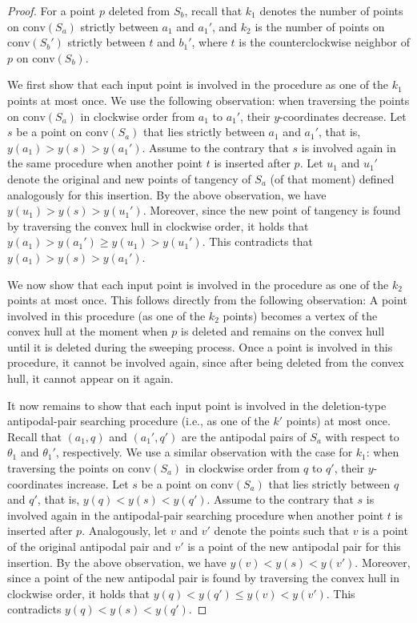 \documentclass[english,a4paper, cleveref, autoref, thm-restate, nolineno]{socg-lipics-v2021}
\theoremstyle{star}
\theoremstyle{claimstar}
\newcommand{\conv}{\ensuremath{\mathrm{conv}}}
\begin{document}
\begin{proof}
    For a point $p$ deleted from $S_b$, recall that $k_1$ denotes the number of points on $\conv(S_a)$ strictly between $a_1$ and $a_1'$, and $k_2$ is the number of points on $\conv(S_b')$ strictly between $t$ and $b_1'$, where $t$ is the counterclockwise neighbor of $p$ on $\conv(S_b)$.

    We first show that each input point is involved in the procedure as one of the $k_1$ points at most once. 
    We use the following observation:
    when traversing the points on $\conv(S_a)$ in clockwise order from $a_1$ to $a_1'$, their $y$-coordinates decrease.
    Let $s$ be a point on $\conv(S_a)$ that lies strictly between $a_1$ and $a_1'$, that is, $y(a_1) > y(s) > y(a_1')$.
    Assume to the contrary that $s$ is involved again in the same procedure when another point $t$ is inserted after $p$.
    Let $u_1$ and $u_1'$ denote the original and new points of tangency of $S_a$ (of that moment) defined analogously for this insertion.
    By the above observation, we have $y(u_1) > y(s) > y(u_1')$.
    Moreover, since the new point of tangency is found by traversing the convex hull in clockwise order, 
    it holds that $y(a_1) > y(a_1') \ge y(u_1) > y(u_1')$.
    This contradicts that $y(a_1) > y(s) > y(a_1')$.

    We now show that each input point is involved in the procedure as one of the $k_2$ points at most once. This follows directly from the following observation:
    A point involved in this procedure (as one of the $k_2$ points) becomes a vertex of the convex hull at the moment when $p$ is deleted and remains on the convex hull until it is deleted during the sweeping process.
    Once a point is involved in this procedure, it cannot be involved again, since after being deleted from the convex hull, it cannot appear on it again.

    It now remains to show that each input point is involved in the deletion-type antipodal-pair searching procedure (i.e., as one of the $k'$ points) at most once.
    Recall that $(a_1, q)$ and $(a_1', q')$ are the antipodal pairs of $S_a$ with respect to $\theta_1$ and $\theta_1'$, respectively.
    We use a similar observation with the case for $k_1$: when traversing the points on $\conv(S_a)$ in clockwise order from $q$ to $q'$, their $y$-coordinates increase.
    Let $s$ be a point on $\conv(S_a)$ that lies strictly between $q$ and $q'$, that is, $y(q) < y(s) < y(q')$.
    Assume to the contrary that $s$ is involved again in the antipodal-pair searching procedure when another point $t$ is inserted after $p$.
    Analogously, let $v$ and $v'$ denote the points such that $v$ is a point of the original antipodal pair and $v'$ is a point of the new antipodal pair for this insertion.
    By the above observation, we have $y(v) < y(s) < y(v')$.
    Moreover, since a point of the new antipodal pair is found by traversing the convex hull in clockwise order, 
    it holds that $y(q) < y(q') \le y(v) < y(v')$.
    This contradicts $y(q) < y(s) < y(q')$.    
\end{proof}
\end{document}
